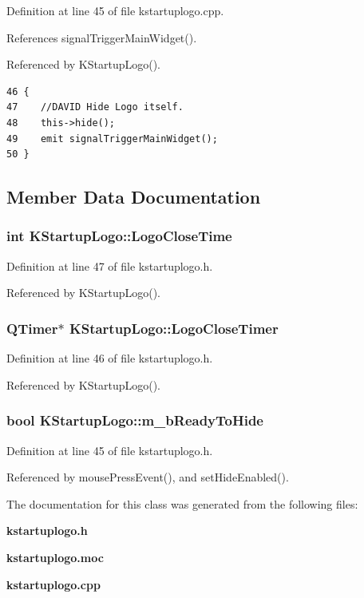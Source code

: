 Definition at line 45 of file kstartuplogo.cpp.

References signal\-Trigger\-Main\-Widget().

Referenced by KStartup\-Logo().



\footnotesize\begin{verbatim}46 {
47    //DAVID Hide Logo itself.
48    this->hide();
49    emit signalTriggerMainWidget();
50 }
\end{verbatim}\normalsize 


\subsection{Member Data Documentation}
\subsubsection{\setlength{\rightskip}{0pt plus 5cm}int {\bf KStartup\-Logo::Logo\-Close\-Time}\hspace{0.3cm}{\tt  [protected]}}\label{classKStartupLogo_KStartupLogop2}




Definition at line 47 of file kstartuplogo.h.

Referenced by KStartup\-Logo().
\subsubsection{\setlength{\rightskip}{0pt plus 5cm}QTimer$\ast$ {\bf KStartup\-Logo::Logo\-Close\-Timer}\hspace{0.3cm}{\tt  [protected]}}\label{classKStartupLogo_KStartupLogop1}




Definition at line 46 of file kstartuplogo.h.

Referenced by KStartup\-Logo().
\subsubsection{\setlength{\rightskip}{0pt plus 5cm}bool {\bf KStartup\-Logo::m\_\-b\-Ready\-To\-Hide}\hspace{0.3cm}{\tt  [protected]}}\label{classKStartupLogo_KStartupLogop0}




Definition at line 45 of file kstartuplogo.h.

Referenced by mouse\-Press\-Event(), and set\-Hide\-Enabled().

The documentation for this class was generated from the following files:\begin{CompactItemize}
\item 
{\bf kstartuplogo.h}\item 
{\bf kstartuplogo.moc}\item 
{\bf kstartuplogo.cpp}\end{CompactItemize}
